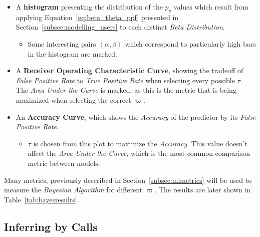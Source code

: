\begin{itemize}
	\item A \textbf{histogram} presenting the distribution of the $p_v$ values which result from applying Equation~\ref{eq:beta_theta_ppf} presented in Section~\ref{subsec:modelling_users} to each distinct \emph{Beta Distribution}.
	\begin{itemize}
		\item Some interesting pairs $\left< \alpha, \beta \right>$ which correspond to particularly high bars in the histogram are marked.
	\end{itemize}
	\item A \textbf{Receiver Operating Characteristic Curve}, showing the tradeoff of \emph{False Positive Rate} to \emph{True Positive Rate} when selecting every possible $\tau$. The \emph{Area Under the Curve} is marked, as this is the metric that is being maximized when selecting the correct $\varpi$.
	\item An \textbf{Accuracy Curve}, which shows the \emph{Accuracy} of the predictor by its \emph{False Positive Rate}.
	\begin{itemize}
		\item $\tau$ is chosen from this plot to maximize the \emph{Accuracy}. This value doesn't affect the \emph{Area Under the Curve}, which is the most common comparison metric between models.
	\end{itemize}
\end{itemize}

Many metrics, previously described in Section~\ref{subsec:mlmetrics} will be used to measure the \emph{Bayesian Algorithm} for different $\varpi$. The results are later shown in Table~\ref{tab:bayesresults}.

\subsection{Inferring by Calls}
\label{subsec:calls_infer}

